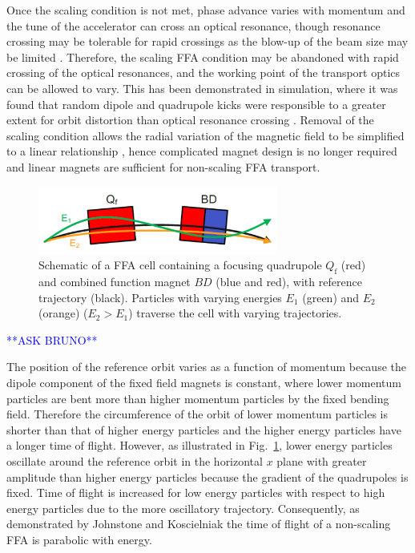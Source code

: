 \documentclass[../main.tex]{subfiles}
\begin{document}
Once the scaling condition is not met, phase advance varies with momentum and the tune of the accelerator can cross an optical resonance, though resonance crossing may be tolerable for rapid crossings as the blow-up of the beam size may be limited \cite{mills1997nsffa,johnstone1997nsffa}. Therefore, the scaling FFA condition may be abandoned with rapid crossing of the optical resonances, and the working point of the transport optics can be allowed to vary. This has been demonstrated in simulation, where it was found that random dipole and quadrupole kicks were responsible to a greater extent for orbit distortion than optical resonance crossing \cite{machida2007orbit}. Removal of the scaling condition allows the radial variation of the magnetic field to be simplified to a linear relationship \cite{johnstone1999fixed}, hence complicated magnet design is no longer required and linear magnets are sufficient for non-scaling FFA transport.
\begin{figure}[!h]
\centering
\includegraphics[width=0.7\textwidth]{Figures/Energy_Recovery_Linac_Design/FFA_cell_fixed.pdf}
\caption{Schematic of a FFA cell containing a focusing quadrupole $Q_{\mathrm{f}}$ (red) and combined function magnet $BD$ (blue and red), with reference trajectory (black). Particles with varying energies $E_{1}$ (green) and $E_{2}$ (orange) ($E_{2}>E_{1}$) traverse the cell with varying trajectories.}
\label{fig:FFA_cell}
\end{figure}

\textcolor{blue}{**ASK BRUNO**}

The position of the reference orbit varies as a function of momentum because the dipole component of the fixed field magnets is constant, where lower momentum particles are bent more than higher momentum particles by the fixed bending field. Therefore the circumference of the orbit of lower momentum particles is shorter than that of higher energy particles and the higher energy particles have a longer time of flight. However, as illustrated in Fig.~\ref{fig:FFA_cell}, lower energy particles oscillate around the reference orbit in the horizontal $x$ plane with greater amplitude than higher energy particles because the gradient of the quadrupoles is fixed. Time of flight is increased for low energy particles with respect to high energy particles due to the more oscillatory trajectory. Consequently, as demonstrated by Johnstone and Koscielniak \cite{johnstone2003ffags} the time of flight of a non-scaling FFA is parabolic with energy. 
\end{document}
